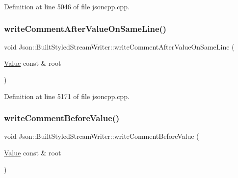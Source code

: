 Definition at line 5046 of file jsoncpp.\+cpp.

\hypertarget{struct_json_1_1_built_styled_stream_writer_a89625b134fce0255263ca40e6125742b}{}\label{struct_json_1_1_built_styled_stream_writer_a89625b134fce0255263ca40e6125742b} 
\subsubsection{\texorpdfstring{write\+Comment\+After\+Value\+On\+Same\+Line()}{writeCommentAfterValueOnSameLine()}}
{\footnotesize\ttfamily void Json\+::\+Built\+Styled\+Stream\+Writer\+::write\+Comment\+After\+Value\+On\+Same\+Line (\begin{DoxyParamCaption}\item[{\hyperlink{class_json_1_1_value}{Value} const \&}]{root }\end{DoxyParamCaption})\hspace{0.3cm}{\ttfamily [private]}}



Definition at line 5171 of file jsoncpp.\+cpp.

\hypertarget{struct_json_1_1_built_styled_stream_writer_a32c4afca4e08fba79bb0a80a8010283a}{}\label{struct_json_1_1_built_styled_stream_writer_a32c4afca4e08fba79bb0a80a8010283a} 
\subsubsection{\texorpdfstring{write\+Comment\+Before\+Value()}{writeCommentBeforeValue()}}
{\footnotesize\ttfamily void Json\+::\+Built\+Styled\+Stream\+Writer\+::write\+Comment\+Before\+Value (\begin{DoxyParamCaption}\item[{\hyperlink{class_json_1_1_value}{Value} const \&}]{root }\end{DoxyParamCaption})\hspace{0.3cm}{\ttfamily [private]}}



